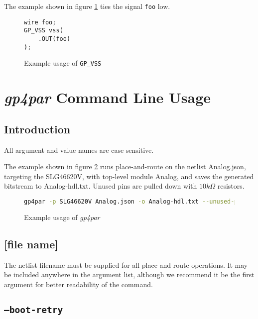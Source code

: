 \documentclass[11pt]{article}
\newcommand{\namestyle}[1]{\textit{#1}}
\newcommand{\tokenstyle}[1]{\texttt{#1}}
\newcommand{\wirestyle}[1]{\texttt{#1}}
\begin{document}
The example shown in figure \ref{gp-vss-example} ties the signal \wirestyle{foo} low.

\begin{figure}[h]
\begin{lstlisting}
wire foo;
GP_VSS vss(
	.OUT(foo)
);
\end{lstlisting}
\caption{Example usage of \tokenstyle{GP\_VSS}}
\label{gp-vss-example}
\end{figure}


\pagebreak
\section{\namestyle{gp4par} Command Line Usage}

\subsection{Introduction}

All argument and value names are case sensitive.

The example shown in figure \ref{gp-cmd-example} runs place-and-route on the netlist Analog.json, targeting the
SLG46620V, with top-level module Analog, and saves the generated bitstream to Analog-hdl.txt. Unused pins are pulled
down with $10 k\Omega$ resistors.

\begin{figure}[h]
\begin{lstlisting}[language=sh]
gp4par -p SLG46620V Analog.json -o Analog-hdl.txt --unused-pull down --unused-drive 10k
\end{lstlisting}
\caption{Example usage of \namestyle{gp4par}}
\label{gp-cmd-example}
\end{figure}

\subsection{[file name]}

The netlist filename must be supplied for all place-and-route operations. It may be included anywhere in the argument
list, although we recommend it be the first argument for better readability of the command.

\subsection{\texttt{--boot-retry}}
\end{document}
